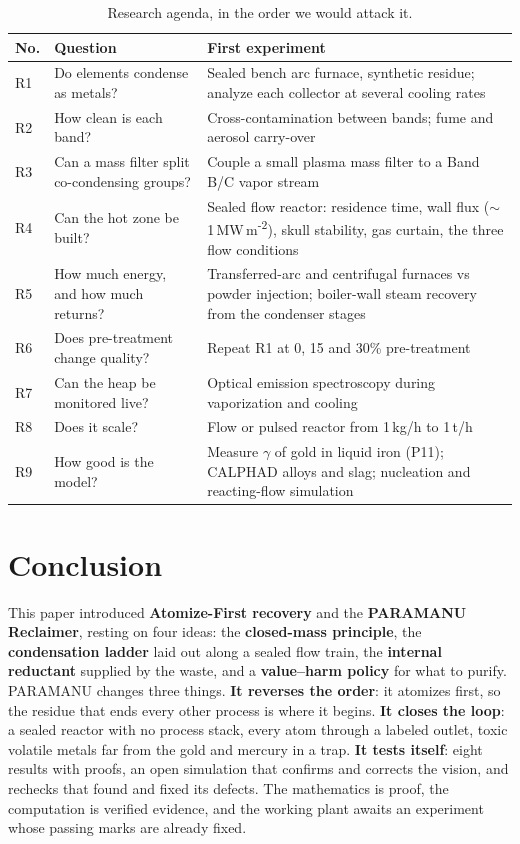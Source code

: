 \documentclass[11pt,a4paper]{article}
\theoremstyle{definition}
\theoremstyle{plain}
\theoremstyle{remark}
\begin{document}
\begin{table}[!htbp]
\centering
\caption{Research agenda, in the order we would attack it.}\label{tab:agenda}
\footnotesize
\begin{tabular}{@{}lp{4.3cm}p{8.9cm}@{}}
\toprule
\textbf{No.} & \textbf{Question} & \textbf{First experiment} \\
\midrule
R1 & Do elements condense as metals? & Sealed bench arc furnace, synthetic residue; analyze each collector at several cooling rates \\
R2 & How clean is each band? & Cross-contamination between bands; fume and aerosol carry-over \\
R3 & Can a mass filter split co-condensing groups? & Couple a small plasma mass filter to a Band B/C vapor stream \\
R4 & Can the hot zone be built? & Sealed flow reactor: residence time, wall flux ($\sim$1\,MW\,m\textsuperscript{-2}), skull stability, gas curtain, the three flow conditions \\
R5 & How much energy, and how much returns? & Transferred-arc and centrifugal furnaces vs powder injection; boiler-wall steam recovery from the condenser stages \\
R6 & Does pre-treatment change quality? & Repeat R1 at 0, 15 and 30\% pre-treatment \\
R7 & Can the heap be monitored live? & Optical emission spectroscopy during vaporization and cooling \\
R8 & Does it scale? & Flow or pulsed reactor from 1\,kg/h to 1\,t/h \\
R9 & How good is the model? & Measure $\gamma$ of gold in liquid iron (P11); CALPHAD alloys and slag; nucleation and reacting-flow simulation \\
\bottomrule
\end{tabular}
\end{table}

\section{Conclusion}

This paper introduced \textbf{Atomize-First recovery} and the \textbf{PARAMANU Reclaimer}, resting on four ideas: the \textbf{closed-mass principle}, the \textbf{condensation ladder} laid out along a sealed flow train, the \textbf{internal reductant} supplied by the waste, and a \textbf{value--harm policy} for what to purify. PARAMANU changes three things. \textbf{It reverses the order}: it atomizes first, so the residue that ends every other process is where it begins. \textbf{It closes the loop}: a sealed reactor with no process stack, every atom through a labeled outlet, toxic volatile metals far from the gold and mercury in a trap. \textbf{It tests itself}: eight results with proofs, an open simulation that confirms and corrects the vision, and rechecks that found and fixed its defects. The mathematics is proof, the computation is verified evidence, and the working plant awaits an experiment whose passing marks are already fixed.
\end{document}
